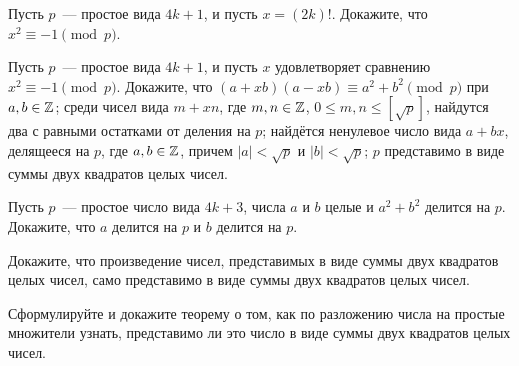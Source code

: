 \documentclass[a4paper, 12pt]{article}
\begin{document}








 Пусть $p$~--- простое вида $4k + 1$, и пусть $x=(2k)!$. Докажите, что
$x^2 \equiv -1 \pmod{p}$.

 Пусть $p$~--- простое вида $4k + 1$, и пусть $x$ удовлетворяет сравнению $x^2 \equiv -1 \pmod{p}$. Докажите, что
 $(a + xb)(a - xb)\equiv a^2 + b^2 \pmod{p}$ при $a,b\in\mathbb{Z}$;
 среди чисел вида $m + xn$, где $m,n\in\mathbb{Z}$, $0 \leq m,n
\leq [\sqrt p]$, найдутся два с равными остатками от деления на $p$;
 найдётся ненулевое число вида $a + bx$, делящееся на
$p$, где $a,b\in\mathbb{Z}$, причем $|a|<\sqrt p$ и $|b|<\sqrt p$;
 $p$ представимо в виде суммы двух квадратов целых чисел.

 Пусть $p$~--- простое число вида $4k+3$, числа $a$ и $b$ целые и $a^2 + b^2$ делится на $p$.
Докажите, что $a$ делится на $p$ и $b$ делится на $p$. %

 Докажите, что произведение чисел, представимых в виде суммы
двух квадратов целых чисел, само представимо в виде суммы двух
квадратов целых чисел. 

 Сформулируйте и докажите теорему о том,
как по разложению числа на простые множители узнать, представимо ли это число
в виде суммы двух квадратов целых чисел.



\end{document}
